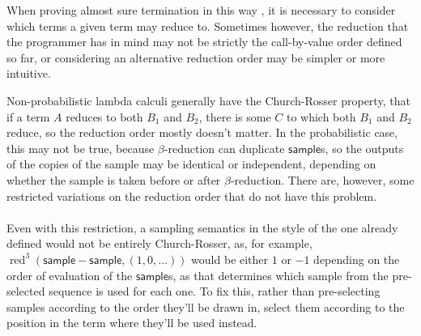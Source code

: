\documentclass{article}
\newcommand{\tsample}{\textsf{sample}}
\DeclareMathOperator{\red}{red}
\theoremstyle{definition}
\theoremstyle{lemma}
\theoremstyle{remark}
\begin{document}
When proving almost sure termination in this way , it is necessary to consider which terms a given term may reduce to. Sometimes however, the reduction that the programmer has in mind may not be strictly the call-by-value order defined so far, or considering an alternative reduction order may be simpler or more intuitive.

Non-probabilistic lambda calculi generally have the Church-Rosser property, that if a term $A$ reduces to both $B_1$ and $B_2$, there is some $C$ 
to which both $B_1$ and $B_2$ reduce,
so the reduction order mostly doesn't matter. In the probabilistic case, this may not be true, because $\beta$-reduction can duplicate $\tsample$s, so the outputs of the copies of the sample may be identical or independent, depending on whether the sample is taken before or after $\beta$-reduction. There are, however, some restricted variations on the reduction order that do not have this problem.

\paragraph{}
Even with this restriction, a sampling semantics in the style of the one already defined would not be entirely Church-Rosser, as, for example, $\red^3(\tsample - \tsample, (1,0,\dots))$ would be either $1$ or $-1$ depending on the order of evaluation of the $\tsample$s, as that determines which sample from the pre-selected sequence is used for each one. To fix this, rather than pre-selecting samples according to the order they'll be drawn in, select them according to the position in the term where they'll be used instead.
\end{document}
